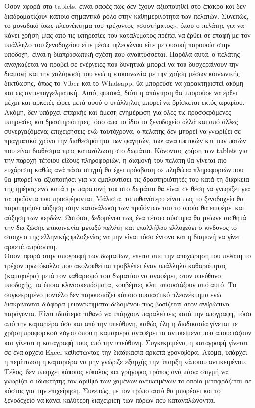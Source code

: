 \noindent	
Όσον αφορά στα tablets, είναι σαφές πως δεν έχουν αξιοποιηθεί στο έπακρο και δεν διαδραματίζουν
κάποιο σημαντικό ρόλο στην καθημερινότητα των πελατών. Συνεπώς, το μοναδικό ίσως πλεονέκτημα του
τρέχοντος «συστήματος», όπου ο πελάτης για να κάνει χρήση μίας από τις υπηρεσίες του καταλύματος
πρέπει να έρθει σε επαφή με τον υπάλληλο του ξενοδοχείου είτε μέσω τηλεφώνου είτε με φυσική 
παρουσία στην υποδοχή, είναι η διαπροσωπική σχέση που αναπτύσσεται. Παρόλα αυτά, ο πελάτης 
αναγκάζεται να προβεί σε ενέργειες που δυνητικά μπορεί να του δυσχεραίνουν την διαμονή και την 
χαλάρωσή του ενώ η επικοινωνία με την χρήση μέσων κοινωνικής δικτύωσης, όπως το Viber και το 
Whatsapp, θα μπορούσε να χαρακτηριστεί ακόμη και ως αντιεπαγγελματική. Αυτό, φυσικά, διότι η 
απάντηση θα μπορούσε να έρθει μέχρι και αρκετές ώρες μετά αφού ο υπάλληλος μπορεί να βρίσκεται 
εκτός ωραρίου. Ακόμη, δεν υπάρχει επαρκής και άμεση ενημέρωση για όλες τις προσφερόμενες 
υπηρεσίες και δραστηριότητες τόσο από το ίδιο το ξενοδοχείο αλλά και από άλλες συνεργαζόμενες 
επιχειρήσεις ενώ ταυτόχρονα, ο πελάτης δεν μπορεί να γνωρίζει σε πραγματικό χρόνο την 
διαθεσιμότητα των φαγητών, των αναψυκτικών και των ποτών που είναι διαθέσιμα προς κατανάλωση
στο δωμάτιο. Κάνοντας χρήση των tablets για την παροχή τέτοιου είδους πληροφοριών, η διαμονή 
του πελάτη θα γίνεται πιο ευχάριστη καθώς ανά πάσα στιγμή θα έχει πρόσβαση σε πληθώρα 
πληροφοριών που θα μπορεί να αξιοποιήσει για να εμπλουτίσει τις δραστηριότητές του κατά τη 
διάρκεια της ημέρας ενώ κατά την παραμονή του στο δωμάτιο θα είναι σε θέση να γνωρίζει για τα 
προϊόντα που προσφέρονται. Μάλιστα, το πιθανότερο είναι πως το ξενοδοχείο θα παρατηρήσει 
αύξηση στην κατανάλωση των προϊόντων του το οποίο θα επιφέρει και αύξηση των κερδών. Ωστόσο, 
δεδομένου πως ένα τέτοιο σύστημα θα μείωνε αισθητά την δια ζώσης επικοινωνία μεταξύ πελάτη και 
υπαλλήλου ελλοχεύει ο κίνδυνος το στοιχείο της ελληνικής φιλοξενίας να μην είναι τόσο έντονο και 
η διαμονή να γίνει αρκετά απρόσωπη.\\

\noindent
Όσον αφορά στην απογραφή των δωματίων, έπειτα από την αποχώρηση του πελάτη το τρέχον 
πρωτόκολλο που ακολουθείται προβλέπει έναν υπάλληλο καθαριότητας (καμαριέρα) μετά τον καθαρισμό 
του δωματίου να αναφέρει, στον υπεύθυνο υποδοχής, τα όποια κλινοσκεπάσματα, κουβέρτες κλπ. 
απουσιάζουν από αυτό. Το συγκεκριμένο μοντέλο δεν παρουσιάζει κάποιο ουσιαστικό πλεονέκτημα ενώ 
διακρίνονται διάφορα μειονεκτήματα δεδομένου πως βασίζεται στον ανθρώπινο παράγοντα. Είναι 
ιδιαίτερα πιθανό να υπάρχουν παραλείψεις κατά την απογραφή, τόσο από την καμαριέρα όσο και από 
την υπεύθυνη, καθώς όλη η διαδικασία γίνεται με χρήση προφορικού λόγου όπου η καμαριέρα αναφέρει 
τα αντικείμενα που απουσιάζουν και γίνεται η καταγραφή τους από την υπεύθυνη. Συγκεκριμένα, η 
καταγραφή γίνεται σε ένα αρχείο Excel καθιστώντας την διαδικασία αρκετά χρονοβόρα. Ακόμα, υπάρχει 
η περίπτωση η καμαριέρα να μην γνώριζε εξαρχής την ύπαρξη κάποιου αντικειμένου. Τέλος, δεν 
υπάρχει κάποιος εύκολος και γρήγορος τρόπος ανά πάσα στιγμή να γνωρίζει ο ιδιοκτήτης τον αριθμό 
των χαμένων αντικειμένων το οποίο μεταφράζεται σε κόστος για την επιχείρηση. Συνεπώς, με τον τρόπο 
αυτό θα μπορέσει και το ξενοδοχείο να κάνει καλύτερη διαχείριση των πόρων που καταναλώνονται.


